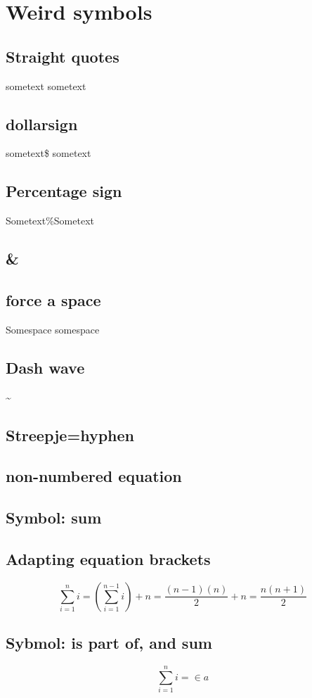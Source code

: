 \section{Weird symbols}
\subsection{Straight quotes}
sometext \textquotedbl sometext\textquotedbl
\subsection{dollarsign}
sometext\$ sometext 
\subsection{Percentage sign}
Sometext\%Sometext
\subsection{\&}
\subsection{force a space}
Somespace \: somespace
\subsection{Dash wave~}
\textasciitilde
\subsection{Streepje=hyphen}
\subsection{non-numbered equation}
\subsection{Symbol: sum}
\subsection{Adapting equation brackets}
\begin{equation*}
\sum_{i=1}^n i = \left(\sum_{i=1}^{n-1} i\right) + n =
\frac{(n-1)(n)}{2} + n = \frac{n(n+1)}{2}
\end{equation*}
\subsection{Sybmol: is part of, and sum}
\begin{equation}
\sum_{i=1}^n i = \in a
\end{equation}
